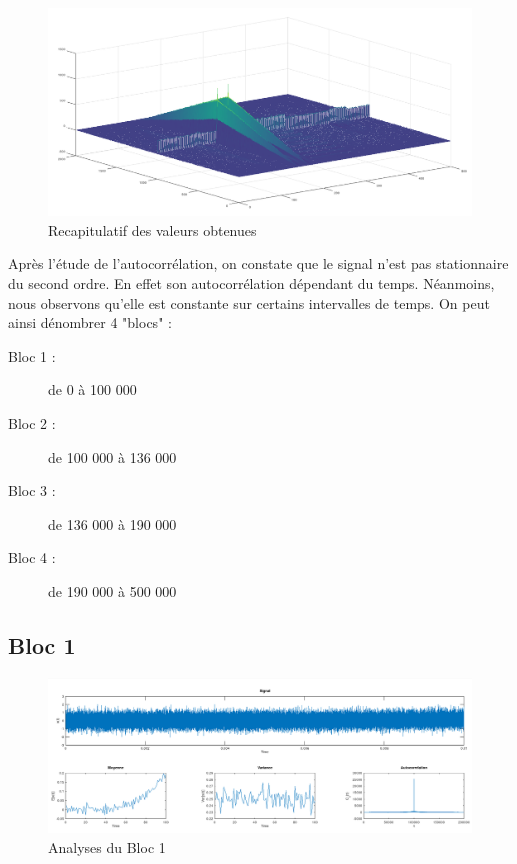 \documentclass[french, a4paper, 12pt, openany]{book}
\begin{document}
	\begin{figure}[ht]
		\begin{center}
		\includegraphics[scale=0.25]{images/AutoCorrFull.png}
		\end{center}
		\caption{Recapitulatif des valeurs obtenues}
		\label{Recapitulatif des valeurs obtenues}
	\end{figure}

	Après l'étude de l'autocorrélation, on constate que le signal n'est pas stationnaire du second ordre. En effet son autocorrélation dépendant du temps. Néanmoins, nous observons qu'elle est constante sur certains intervalles de temps. On peut ainsi dénombrer 4 "blocs" :

  \begin{description}
    \item[Bloc 1 : ]de 0 à 100 000
    \item[Bloc 2 : ]de 100 000 à 136 000
    \item[Bloc 3 : ]de 136 000 à 190 000
    \item[Bloc 4 : ]de 190 000 à 500 000
  \end{description}
  \subsection{Bloc 1}
	\begin{figure}[ht]
    \begin{center}
    \includegraphics[scale=0.25]{images/SignalBloc1.png}
    \end{center}
    \caption{Analyses du Bloc 1}
    \label{Analyses du Bloc 1}
  \end{figure}
\end{document}
